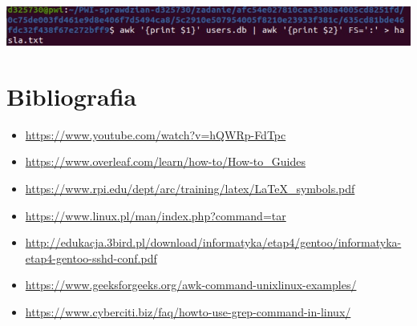 \documentclass[12pt]{article}
\begin{document}
\begin{enumerate}
    \includegraphics[scale = 0.9]{12.jpg}    
    
\end{enumerate}
\newpage
\section*{Bibliografia}
\begin{itemize}
    \item \url{https://www.youtube.com/watch?v=hQWRp-FdTpc}
    \item \url{https://www.overleaf.com/learn/how-to/How-to_Guides}
    \item \url{https://www.rpi.edu/dept/arc/training/latex/LaTeX_symbols.pdf}
    \item \url{https://www.linux.pl/man/index.php?command=tar}
    \item \url{http://edukacja.3bird.pl/download/informatyka/etap4/gentoo/informatyka-etap4-gentoo-sshd-conf.pdf}
    \item \url{https://www.geeksforgeeks.org/awk-command-unixlinux-examples/}
    \item \url{https://www.cyberciti.biz/faq/howto-use-grep-command-in-linux/}
    
\end{itemize}
\end{document}
